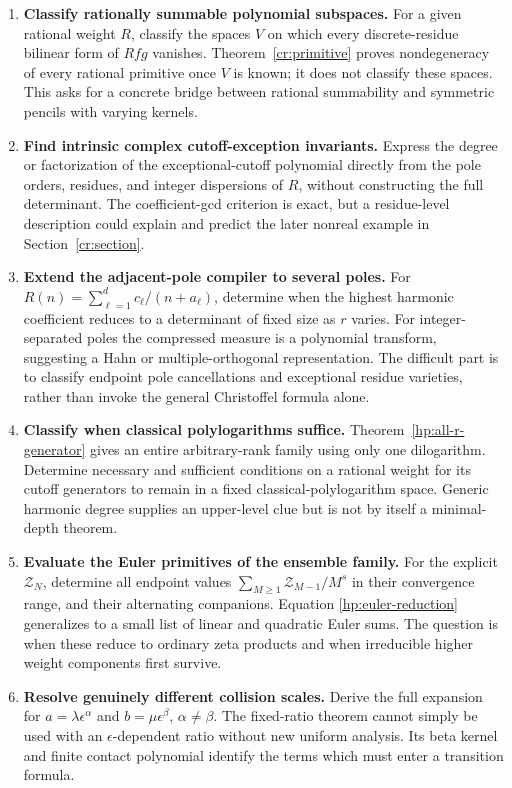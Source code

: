 \begin{enumerate}[label=\textbf{Q\arabic*.},leftmargin=*]
\item \textbf{Classify rationally summable polynomial subspaces.}
For a given rational weight $R$, classify the spaces $V$ on
which every discrete-residue bilinear form of $Rfg$ vanishes.
Theorem~\ref{cr:primitive} proves nondegeneracy of every rational
primitive once $V$ is known; it does not classify these spaces.
This asks for a concrete bridge between rational summability
and symmetric pencils with varying kernels.

\item \textbf{Find intrinsic complex cutoff-exception invariants.}
Express the degree or factorization of the exceptional-cutoff
polynomial directly from the pole orders, residues, and integer
dispersions of $R$, without constructing the full determinant.
The coefficient-gcd criterion is exact, but a residue-level
description could explain and predict the later nonreal example
in Section~\ref{cr:section}.

\item \textbf{Extend the adjacent-pole compiler to several poles.}
For $R(n)=\sum_{\ell=1}^d c_\ell/(n+a_\ell)$, determine when
the highest harmonic coefficient reduces to a determinant of
fixed size as $r$ varies. For integer-separated poles the
compressed measure is a polynomial transform, suggesting a
Hahn or multiple-orthogonal representation. The difficult
part is to classify endpoint pole cancellations and exceptional
residue varieties, rather than invoke the general Christoffel
formula alone.

\item \textbf{Classify when classical polylogarithms suffice.}
Theorem~\ref{hp:all-r-generator} gives an entire arbitrary-rank
family using only one dilogarithm. Determine necessary and
sufficient conditions on a rational weight for its cutoff
generators to remain in a fixed classical-polylogarithm space.
Generic harmonic degree supplies an upper-level clue but is
not by itself a minimal-depth theorem.

\item \textbf{Evaluate the Euler primitives of the ensemble family.}
For the explicit $\mathcal Z_N$, determine all endpoint values
$\sum_{M\ge1}\mathcal Z_{M-1}/M^s$ in their convergence range,
and their alternating companions. Equation
\eqref{hp:euler-reduction} generalizes to a small list of
linear and quadratic Euler sums. The question is when these
reduce to ordinary zeta products and when irreducible higher
weight components first survive.

\item \textbf{Resolve genuinely different collision scales.}
Derive the full expansion for
$a=\lambda\epsilon^\alpha$ and $b=\mu\epsilon^\beta$,
$\alpha\ne\beta$. The fixed-ratio theorem cannot simply be
used with an $\epsilon$-dependent ratio without new uniform
analysis. Its beta kernel and finite contact polynomial
identify the terms which must enter a transition formula.


\end{enumerate}
